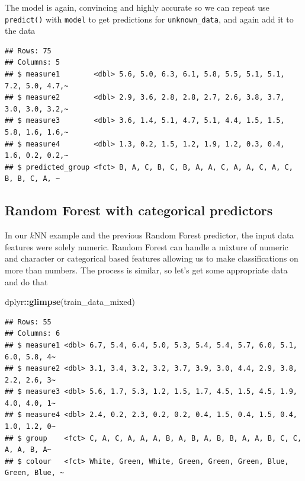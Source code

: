\documentclass[
]{book}
\newenvironment{Shaded}{\begin{snugshade}}{\end{snugshade}}
\newcommand{\DataTypeTok}[1]{\textcolor[rgb]{0.13,0.29,0.53}{#1}}
\newcommand{\KeywordTok}[1]{\textcolor[rgb]{0.13,0.29,0.53}{\textbf{#1}}}
\newcommand{\NormalTok}[1]{#1}
\newcommand{\OperatorTok}[1]{\textcolor[rgb]{0.81,0.36,0.00}{\textbf{#1}}}
\newcommand{\StringTok}[1]{\textcolor[rgb]{0.31,0.60,0.02}{#1}}
\begin{document}
The model is again, convincing and highly accurate so we can repeat use \texttt{predict()} with \texttt{model} to get predictions for \texttt{unknown\_data}, and again add it to the data

\begin{Shaded}
\end{Shaded}

\begin{verbatim}
## Rows: 75
## Columns: 5
## $ measure1        <dbl> 5.6, 5.0, 6.3, 6.1, 5.8, 5.5, 5.1, 5.1, 7.2, 5.0, 4.7,~
## $ measure2        <dbl> 2.9, 3.6, 2.8, 2.8, 2.7, 2.6, 3.8, 3.7, 3.0, 3.0, 3.2,~
## $ measure3        <dbl> 3.6, 1.4, 5.1, 4.7, 5.1, 4.4, 1.5, 1.5, 5.8, 1.6, 1.6,~
## $ measure4        <dbl> 1.3, 0.2, 1.5, 1.2, 1.9, 1.2, 0.3, 0.4, 1.6, 0.2, 0.2,~
## $ predicted_group <fct> B, A, C, B, C, B, A, A, C, A, A, C, A, C, B, B, C, A, ~
\end{verbatim}

\hypertarget{random-forest-with-categorical-predictors}{%
\subsection{Random Forest with categorical predictors}\label{random-forest-with-categorical-predictors}}

In our \(k\)NN example and the previous Random Forest predictor, the input data features were solely numeric. Random Forest can handle a mixture of numeric and character or categorical based features allowing us to make classifications on more than numbers. The process is similar, so let's get some appropriate data and do that

\begin{Shaded}
\begin{Highlighting}[]
\NormalTok{dplyr}\OperatorTok{::}\KeywordTok{glimpse}\NormalTok{(train_data_mixed)}
\end{Highlighting}
\end{Shaded}

\begin{verbatim}
## Rows: 55
## Columns: 6
## $ measure1 <dbl> 6.7, 5.4, 6.4, 5.0, 5.3, 5.4, 5.4, 5.7, 6.0, 5.1, 6.0, 5.8, 4~
## $ measure2 <dbl> 3.1, 3.4, 3.2, 3.2, 3.7, 3.9, 3.0, 4.4, 2.9, 3.8, 2.2, 2.6, 3~
## $ measure3 <dbl> 5.6, 1.7, 5.3, 1.2, 1.5, 1.7, 4.5, 1.5, 4.5, 1.9, 4.0, 4.0, 1~
## $ measure4 <dbl> 2.4, 0.2, 2.3, 0.2, 0.2, 0.4, 1.5, 0.4, 1.5, 0.4, 1.0, 1.2, 0~
## $ group    <fct> C, A, C, A, A, A, B, A, B, A, B, B, A, A, B, C, C, A, A, B, A~
## $ colour   <fct> White, Green, White, Green, Green, Green, Blue, Green, Blue, ~
\end{verbatim}
\end{document}

